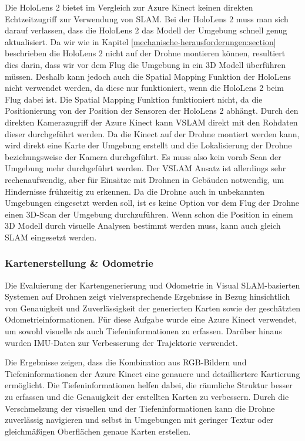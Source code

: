 Die HoloLens 2 bietet im Vergleich zur Azure Kinect keinen direkten Echtzeitzugriff zur Verwendung von \ac{SLAM}. Bei der HoloLens 2 muss man sich darauf verlassen, dass die HoloLens 2 das Modell der Umgebung schnell genug aktualisiert. Da wir wie in Kapitel \ref{mechanische-herausforderungen:section} beschrieben die HoloLens 2 nicht auf der Drohne montieren können, resultiert dies darin, dass wir vor dem Flug die Umgebung in ein 3D Modell überführen müssen. Deshalb kann jedoch auch die Spatial Mapping Funktion der HoloLens nicht verwendet werden, da diese nur funktioniert, wenn die HoloLens 2 beim Flug dabei ist.
Die Spatial Mapping Funktion funktioniert nicht, da die Positionierung von der Position der Sensoren der HoloLens 2 abhängt.
Durch den direkten Kamerazugriff der Azure Kinect kann \ac{VSLAM} direkt mit den Rohdaten dieser durchgeführt werden. Da die Kinect auf der Drohne montiert werden kann, wird direkt eine Karte der Umgebung erstellt und die Lokalisierung der Drohne beziehungsweise der Kamera durchgeführt. Es muss also kein vorab Scan der Umgebung mehr durchgeführt werden. Der \ac{VSLAM} Ansatz ist allerdings sehr rechenaufwendig, aber für Einsätze mit Drohnen in Gebäuden notwendig, um Hindernisse frühzeitig zu erkennen. Da die Drohne auch in unbekannten Umgebungen eingesetzt werden soll, ist es keine Option vor dem Flug der Drohne einen 3D-Scan der Umgebung durchzuführen. Wenn schon die Position in einem 3D Modell durch visuelle Analysen bestimmt werden muss, kann auch gleich \ac{SLAM} eingesetzt werden.

\subsubsection{Kartenerstellung \& Odometrie}

Die Evaluierung der Kartengenerierung und Odometrie in Visual SLAM-basierten Systemen auf Drohnen zeigt vielversprechende Ergebnisse in Bezug hinsichtlich von Genauigkeit und Zuverlässigkeit der generierten Karten sowie der geschätzten Odometrieinformationen. Für diese Aufgabe wurde eine Azure Kinect verwendet, um sowohl visuelle als auch Tiefeninformationen zu erfassen. Darüber hinaus wurden \ac{IMU}-Daten zur Verbesserung der Trajektorie verwendet.

Die Ergebnisse zeigen, dass die Kombination aus RGB-Bildern und Tiefeninformationen der Azure Kinect eine genauere und detailliertere Kartierung ermöglicht. Die Tiefeninformationen helfen dabei, die räumliche Struktur besser zu erfassen und die Genauigkeit der erstellten Karten zu verbessern. Durch die Verschmelzung der visuellen und der Tiefeninformationen kann die Drohne zuverlässig navigieren und selbst in Umgebungen mit geringer Textur oder gleichmäßigen Oberflächen genaue Karten erstellen.

